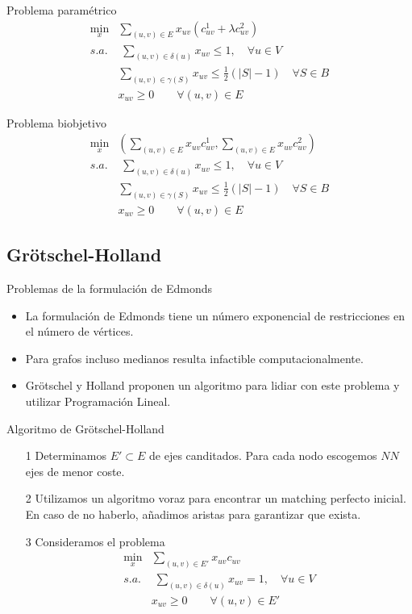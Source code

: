 \documentclass{beamer}
\begin{document}
\begin{frame}{Problema paramétrico}\begin{align*}
\min_x & \sum_{(u,v) \in E}x_{uv} (c^1_{uv} + \lambda c^2_{uv})\\
s.a.&\;\sum_{(u,v)\in\delta(u)} x_{uv} \leq 1, \quad \forall u \in V\\
&\sum_{(u,v)\in \gamma(S)} x_{uv} \leq \frac{1}{2}(|S|-1)\quad \forall S \in B	\\
&x_{uv} \geq 0 \qquad \forall(u,v)\in E
\end{align*}
\end{frame}
\begin{frame}{Problema biobjetivo}
\begin{align*}
\min_x & \left(\sum_{(u,v) \in E}x_{uv}c^1_{uv},\sum_{(u,v) \in E}x_{uv} c^2_{uv}\right)\\
s.a.&\;\sum_{(u,v)\in\delta(u)} x_{uv} \leq 1, \quad \forall u \in V\\
&\sum_{(u,v)\in \gamma(S)} x_{uv} \leq \frac{1}{2}(|S|-1)\quad \forall S \in B	\\
&x_{uv} \geq 0 \qquad \forall(u,v)\in E
\end{align*}
\end{frame}
\subsection{Grötschel-Holland}
\begin{frame}{Problemas de la formulación de Edmonds}
\begin{itemize}
\item La formulación de Edmonds tiene un número exponencial de restricciones en el número de vértices.
\item Para grafos incluso medianos resulta infactible computacionalmente.
\item Grötschel y Holland proponen un algoritmo para lidiar con este problema y utilizar Programación Lineal.
\end{itemize}
\end{frame}

\begin{frame}{Algoritmo de Grötschel-Holland}
\begin{enumerate}
\item[1] Determinamos $E'\subset E$ de ejes canditados. Para cada nodo escogemos $NN$ ejes de menor coste. 
\item[2] Utilizamos un algoritmo voraz para encontrar un matching perfecto inicial. En caso de no haberlo, añadimos aristas para garantizar que exista.
\item[3] Consideramos el problema
\begin{align*}
\min_x & \sum_{(u,v) \in E'}x_{uv}c_{uv}\\
s.a.&\;\sum_{(u,v)\in\delta(u)} x_{uv} = 1, \quad \forall u \in V\\
&x_{uv} \geq 0 \qquad \forall(u,v)\in E'
\end{align*}
\end{enumerate}
\end{frame}
\end{document}
